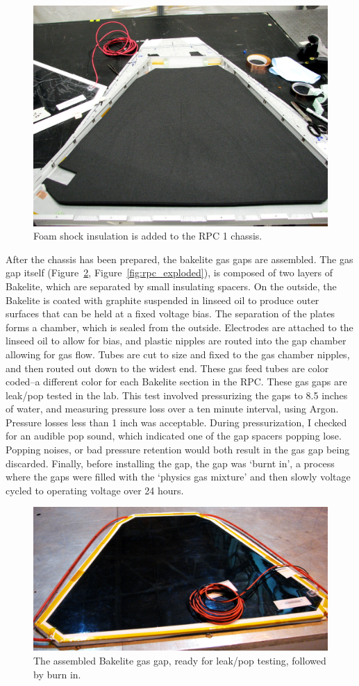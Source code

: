 \begin{figure}
  \centering
  \includegraphics[width=0.7\linewidth]{./figures/rpc1_construction_2}
  \caption{
    Foam shock insulation is added to the RPC 1 chassis.
  }
  \label{fig:rpc1_construction_2}
\end{figure}

After the chassis has been prepared, the bakelite gas gaps are assembled. The
gas gap itself (Figure~\ref{fig:rpc1_construction_3},
Figure~\ref{fig:rpc_exploded}), is composed of two layers of Bakelite, which are
separated by small insulating spacers. On the outside, the Bakelite is coated
with graphite suspended in linseed oil to produce outer surfaces that can be
held at a fixed voltage bias.  The separation of the plates forms a chamber,
which is sealed from the outside.  Electrodes are attached to the linseed oil to
allow for bias, and plastic nipples are routed into the gap chamber allowing for
gas flow. Tubes are cut to size and fixed to the gas chamber nipples, and then
routed out down to the widest end. These gas feed tubes are color coded--a
different color for each Bakelite section in the RPC. These gas gaps are
leak/pop tested in the lab.  This test involved pressurizing the gaps to 8.5
inches of water, and measuring pressure loss over a ten minute interval, using
Argon. Pressure losses less than 1 inch was acceptable. During pressurization, I
checked for an audible pop sound, which indicated one of the gap spacers popping
lose. Popping noises, or bad pressure retention would both result in the gas gap
being discarded.  Finally, before installing the gap, the gap was `burnt in', a
process where the gaps were filled with the `physics gas mixture' and then
slowly voltage cycled to operating voltage over 24 hours.

\begin{figure}
  \centering
  \includegraphics[width=0.7\linewidth]{./figures/rpc1_construction_3}
  \caption{
    The assembled Bakelite gas gap, ready for leak/pop testing, followed by burn
    in.
  }
  \label{fig:rpc1_construction_3}
\end{figure}

